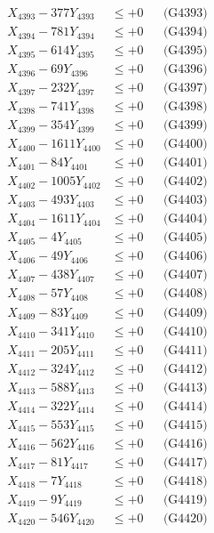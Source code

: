 \documentclass[a4paper,10pt]{article}
\begin{document}
{\begin{align}
X_{4393} - 377Y_{4393} &\leq +0 && \text{(G4393)} \\
X_{4394} - 781Y_{4394} &\leq +0 && \text{(G4394)} \\
X_{4395} - 614Y_{4395} &\leq +0 && \text{(G4395)} \\
X_{4396} - 69Y_{4396} &\leq +0 && \text{(G4396)} \\
X_{4397} - 232Y_{4397} &\leq +0 && \text{(G4397)} \\
X_{4398} - 741Y_{4398} &\leq +0 && \text{(G4398)} \\
X_{4399} - 354Y_{4399} &\leq +0 && \text{(G4399)} \\
X_{4400} - 1611Y_{4400} &\leq +0 && \text{(G4400)} \\
\allowbreak
X_{4401} - 84Y_{4401} &\leq +0 && \text{(G4401)} \\
X_{4402} - 1005Y_{4402} &\leq +0 && \text{(G4402)} \\
X_{4403} - 493Y_{4403} &\leq +0 && \text{(G4403)} \\
X_{4404} - 1611Y_{4404} &\leq +0 && \text{(G4404)} \\
X_{4405} - 4Y_{4405} &\leq +0 && \text{(G4405)} \\
X_{4406} - 49Y_{4406} &\leq +0 && \text{(G4406)} \\
X_{4407} - 438Y_{4407} &\leq +0 && \text{(G4407)} \\
X_{4408} - 57Y_{4408} &\leq +0 && \text{(G4408)} \\
X_{4409} - 83Y_{4409} &\leq +0 && \text{(G4409)} \\
X_{4410} - 341Y_{4410} &\leq +0 && \text{(G4410)} \\
\allowbreak
X_{4411} - 205Y_{4411} &\leq +0 && \text{(G4411)} \\
X_{4412} - 324Y_{4412} &\leq +0 && \text{(G4412)} \\
X_{4413} - 588Y_{4413} &\leq +0 && \text{(G4413)} \\
X_{4414} - 322Y_{4414} &\leq +0 && \text{(G4414)} \\
X_{4415} - 553Y_{4415} &\leq +0 && \text{(G4415)} \\
X_{4416} - 562Y_{4416} &\leq +0 && \text{(G4416)} \\
X_{4417} - 81Y_{4417} &\leq +0 && \text{(G4417)} \\
X_{4418} - 7Y_{4418} &\leq +0 && \text{(G4418)} \\
X_{4419} - 9Y_{4419} &\leq +0 && \text{(G4419)} \\
X_{4420} - 546Y_{4420} &\leq +0 && \text{(G4420)} \\

\end{align}}
\end{document}
